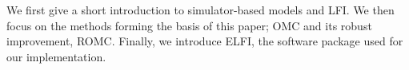 We first give a short introduction to simulator-based models and
LFI. We then focus on the methods forming the basis of this paper; OMC
and its robust improvement, ROMC. Finally, we introduce ELFI, the
software package used for our implementation.
